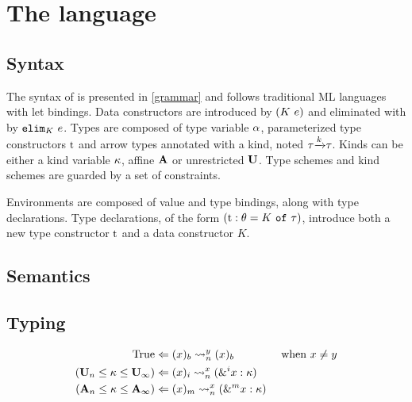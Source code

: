 \section{The \lang language}

\subsection{Syntax}

The syntax of \lang is presented in \cref{grammar} and follows
traditional ML languages with let bindings.
Data constructors are introduced by $\introK{K}{e}$ and eliminated
with by $\elimK{K}{e}$.
Types are composed of type variable $\tvar$, parameterized type constructors
$\T{t}$ and arrow types annotated with a kind, noted $\tau \tarr{k} \tau$.
Kinds can be either a kind variable $\kvar$, affine $\kaff$ or unrestricted $\kun$.
Type schemes and kind schemes are guarded by a set of constraints.

Environments are composed of value and type bindings, along with type
declarations. Type declarations, of the form
$\tydecl{t}{\kschm}{K}{\tau}$, introduce both a new type constructor $\T{t}$ and
a data constructor $K$.

\begin{figure*}[t]
  \centering
  
  \caption{Syntax}
  \label{grammar}
\end{figure*}


\subsection{Semantics}



\subsection{Typing}


\begin{figure*}[!h]
  \centering
  \begin{minipage}{0.45\linewidth}
    \begin{align*}
      \tregion{\Ctrue&}{y}
        {\bshadow{x}}{\bshadow{x}}&\text{ when } x \neq y\\
      \tregion{(\kun_n\lk\kvar\lk\kun_\infty)&}{x}
        {\bshadow[i]{x}}{\bvar{\borrow[i]{x}}{\kvar}}\\
      \tregion{(\kaff_n\lk\kvar\lk\kaff_\infty)&}{x}
        {\bshadow[m]{x}}{\bvar{\borrow[m]{x}}{\kvar}}
    \end{align*}
    \caption{Borrowing}
    \label{typesplit}
  \end{minipage}
\end{figure*}

